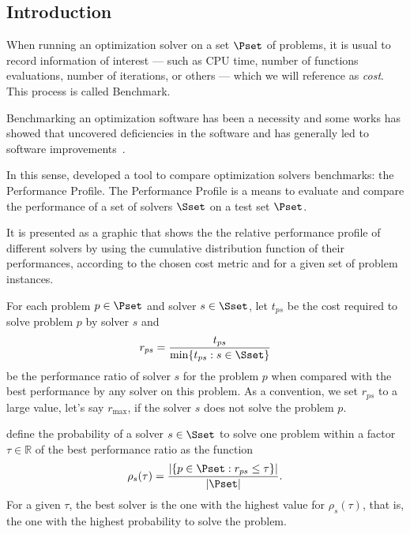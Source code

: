 \subsection*{Introduction}

    When running an optimization solver on a set  $\Pset$ of problems, it is
    usual to record   information of interest --- such as CPU time, number of functions     evaluations, number of iterations, or others --- which we will reference    as \emph{cost}. This process is  called Benchmark. 

    Benchmarking an optimization software has been a necessity and some works 
    has showed that uncovered deficiencies in the software and has 
    generally led to software improvements~\cite{url:mittelmann,Mittelmann:1999fb,Dolan:2006kl}. 

    In this
    sense,  \textcite{Dolan:2002du} developed a tool to compare optimization solvers benchmarks:  the Performance Profile.
    The Performance Profile is a means 
    to evaluate and compare the performance of a set of solvers $\Sset$ on a 
    test set $\Pset$. 

    It is presented as a graphic that shows the the relative performance profile of different solvers by using the cumulative
    distribution function of their performances,
    according to the  chosen cost metric and for a given set of problem instances.

    For each problem $p \in \Pset$ and solver $s \in \Sset$, let $t_{ps}$
    be the cost required to solve problem $p$ by solver $s$ and
    \begin{align*} r_{ps} = \frac{t_{ps}}{\min\{t_{ps}: s \in \Sset\}}
    \end{align*} be the performance ratio of solver $s$ for the problem $p$
    when compared with the best performance by any solver on this problem.
    As a convention, we set $r_{ps}$ to a large value, let's say $r_{\max}$, if
    the solver $s$ does not solve the problem $p$.


    \textcite{Dolan:2002du} define the probability of a solver $s \in \Sset$ to
    solve one problem within a factor $\tau \in \mathds{R}$ of the best
    performance ratio as the function
    \begin{align*}
      \rho_s(\tau) = \frac{| \{p \in \Pset: r_{ps} \leq \tau\} |}{| \Pset |}.
    \end{align*}
    For a given $\tau$, the best solver is the one with the highest value for
    $\rho_s(\tau)$, that is, the one with the highest probability to solve the
    problem.


